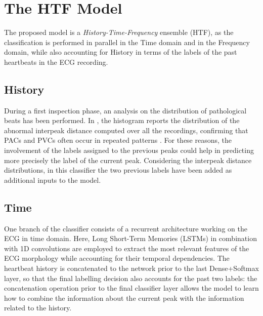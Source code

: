 \documentclass[conference]{IEEEtran}
\begin{document}
\section{The HTF Model}
    The proposed model is a \textit{History-Time-Frequency} ensemble
    (HTF), as the classification is performed in parallel in the Time
    domain and in the Frequency domain, while also accounting for
    History in terms of the labels of the past heartbeats in the ECG
    recording. 

\subsection{History}
    During a first inspection phase, an analysis on the distribution
    of pathological beats has been performed. In , the
    histogram reports the distribution of the abnormal interpeak
    distance computed over all the recordings, confirming that PACs
    and PVCs often occur in repeated patterns \cite{premature_v}
    \cite{frequent_premature} \cite{relation_of}. For these reasons, the involvement of
    the labels assigned to the previous peaks could help in predicting
    more precisely the label of the current peak. Considering the
    interpeak distance distributions, in this classifier the two
    previous labels have been added as additional inputs to the model.

\subsection{Time}
    One branch of the classifier consists of a recurrent architecture
    working on the ECG in time domain. Here, Long Short-Term Memories
    (LSTMs) in combination with 1D convolutions are employed to
    extract the most relevant features of the ECG morphology while
    accounting for their temporal dependencies. The heartbeat history
    is concatenated to the network prior to the last Dense+Softmax
    layer, so that the final labelling decision also accounts for the
    past two labels: the concatenation operation prior to the final
    classifier layer allows the model to learn how to combine the
    information about the current peak with the information related to
    the history.
\end{document}
